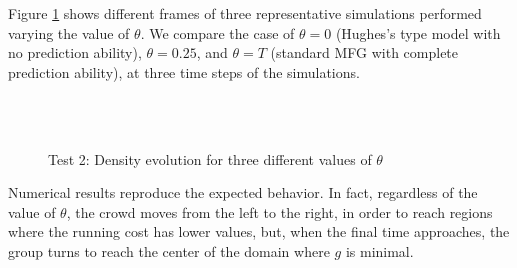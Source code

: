 \documentclass{cmslatex}
\newcommand{\TODO}[1]{\textcolor{red}{#1}}
\begin{document}
Figure \ref{fig:test2} shows different frames of three representative simulations performed varying the value of $\theta$. 
We compare the case of 
$\theta=0$ (Hughes's type model with no prediction ability), 
$\theta=0.25$, and 
$\theta=T$ (standard MFG with complete prediction ability), 
at three time steps of the simulations. 
%
\begin{figure}[h!]
\centering
{}
\hspace{0 mm}
\hspace{0 mm}
\\
\vspace{0 mm}
\hspace{0 mm}
\hspace{0 mm}
\\
\vspace{0 mm}
\hspace{0 mm}
\hspace{0 mm}
\caption{Test 2: Density evolution for three different values of $\theta$}
\label{fig:test2}
\end{figure}
%
Numerical results reproduce the expected behavior. In fact, regardless of the value of $\theta$, the crowd moves from the left to the right, in order to reach regions where the running cost has lower values, but, when the final time approaches, the group turns to reach the center of the domain where $g$ is minimal. 
\end{document}
